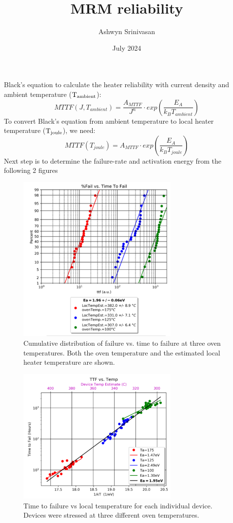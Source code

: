 \documentclass{article}
\title{MRM reliability}
\author{Ashwyn Srinivasan}
\date{July 2024}
\begin{document}

Black's equation to calculate the heater reliability with current density and ambient temperature ($\rm{T_{ambient}}$):
\begin{equation}
MTTF(J,T_{ambient}) = \frac{A_{MTTF}}{J^{n}} \cdot exp(\frac{E_A}{k_B T_{ambient}})
\end{equation}
To convert  Black's equation from ambient temperature to local heater temperature ($\rm{T_{joule}}$), we need:
\begin{equation}
MTTF(T_{joule}) = A_{MTTF} \cdot exp(\frac{E_A}{k_B T_{joule}})
\end{equation}
Next step is to determine the failure-rate and activation energy from the following 2 figures
\begin{figure}[htp]
	\centering
	\includegraphics[width=8cm]{figure_5.png}
	\caption{Cumulative distribution of failure vs. time to failure at three oven temperatures. Both the oven temperature and the estimated local heater temperature are shown. }
	\label{fig:gffig5}
\end{figure}
\begin{figure}[htp]
	\centering
	\includegraphics[width=8cm]{figure_6.png}
	\caption{Time to failure vs local temperature for each individual device. Devices were stressed at three different oven temperatures.}
	\label{fig:gffig6}
\end{figure}
\end{document}
